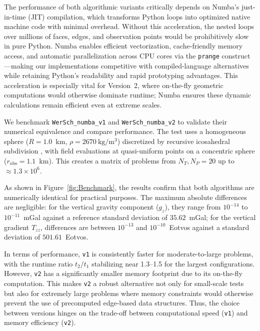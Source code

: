 \documentclass{seg}
\begin{document}
The performance of both algorithmic variants critically depends on Numba's just-in-time (JIT) compilation, which transforms Python loops into optimized native machine code with minimal overhead. Without this acceleration, the nested loops over millions of faces, edges, and observation points would be prohibitively slow in pure Python. Numba enables efficient vectorization, cache-friendly memory access, and automatic parallelization across CPU cores via the \texttt{prange} construct—making our implementations competitive with compiled-language alternatives while retaining Python's readability and rapid prototyping advantages. This acceleration is especially vital for Version~2, where on-the-fly geometric computations would otherwise dominate runtime; Numba ensures these dynamic calculations remain efficient even at extreme scales.

We benchmark \texttt{WerSch\_numba\_v1} and \texttt{WerSch\_numba\_v2} to validate their numerical equivalence and compare performance. The test uses a homogeneous sphere ($R = 1.0$~km, $\rho = 2670~\mathrm{kg/m^3}$) discretized by recursive icosahedral subdivision \citep{Zhang2018JGeod,Wu2021J.Geophys.Res.SolidEarth}, with field evaluations at quasi-uniform points on a concentric sphere ($r_{\mathrm{obs}} = 1.1$~km). This creates a matrix of problems from $N_T, N_P = 20$ up to $\approx 1.3 \times 10^6$.

As shown in Figure~\ref{fig:Benchmark}, the results confirm that both algorithms are numerically identical for practical purposes. The maximum absolute differences are negligible: for the vertical gravity component ($g_z$), they range from $10^{-14}$ to $10^{-11}$~mGal against a reference standard deviation of $35.62$~mGal; for the vertical gradient $T_{zz}$, differences are between $10^{-13}$ and $10^{-10}$~Eotvos against a standard deviation of $501.61$~Eotvos.

In terms of performance, \texttt{v1} is consistently faster for moderate-to-large problems, with the runtime ratio $t_2/t_1$ stabilizing near 1.3--1.5 for the largest configurations. However, \texttt{v2} has a significantly smaller memory footprint due to its on-the-fly computation. This makes \texttt{v2} a robust alternative not only for small-scale tests but also for extremely large problems where memory constraints would otherwise prevent the use of precomputed edge-based data structures. Thus, the choice between versions hinges on the trade-off between computational speed (\texttt{v1}) and memory efficiency (\texttt{v2}).
\end{document}
